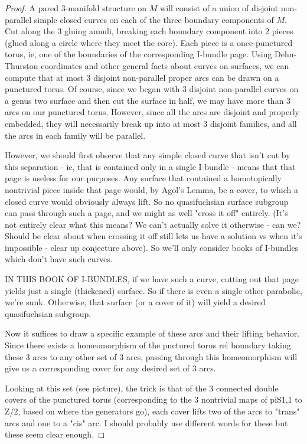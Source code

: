 \documentclass[12pt]{amsart}
\theoremstyle{definition}
\begin{document}
\begin{proof}
A pared 3-manifold structure on $M$ will consist of a union of disjoint
non-parallel simple closed curves on each of the three boundary components of
$M$. Cut along the 3 gluing annuli, breaking each boundary component into
2 pieces (glued along a circle where they meet the core). Each piece is
a once-punctured torus, ie, one of the boundaries of the corresponding
I-bundle page. Using Dehn-Thurston coordinates and other general facts about
curves on surfaces, we can compute that at most 3 disjoint non-parallel
proper arcs can be drawn on a punctured torus. Of course, since we began with
3 disjoint non-parallel curves on a genus two surface and then cut the
surface in half, we may have more than 3 arcs on our punctured torus.
However, since all the arcs are disjoint and properly embedded, they will
necessarily break up into at most
3 disjoint families, and all the arcs in each family will be parallel.

However, we should first observe that any simple closed curve that isn't cut by
this separation - ie, that is contained only in a single I-bundle - means that
that page is useless for our purposes. Any surface that contained
a homotopically nontrivial piece inside that page would, by Agol's Lemma, be
a cover, to which a closed curve would obviously always lift. So no
quasifuchsian surface subgroup can pass through such a page, and we might as
well "cross it off" entirely. (It's not entirely clear what this means? We
can't actually solve it otherwise - can we? Should be clear about when crossing
it off still lets us have a solution vs when it's impossible - clear up
conjecture above). So we'll only consider books of I-bundles which don't have
such curves.

IN THIS BOOK OF I-BUNDLES, if we have such a curve, cutting out that page
yields just a single (thickened) surface. So if there is even a single other
parabolic, we're sunk. Otherwise, that surface (or a cover of it) will yield
a desired quasifuchsian subgroup.

Now it suffices to draw a specific example of these arcs and their lifting
behavior. Since there exists a homeomorphism of the pnctured torus rel boundary
taking these 3 arcs to any other set of 3 arcs, passing through this
homeomorphism will give us a corresponding cover for any desired set of 3 arcs.

Looking at this set (see picture), the trick is that of the 3 connected double
covers of the punctured torus (corresponding to the 3 nontrivial maps of piS1,1
to Z/2, based on where the generators go), each cover lifts two of the arcs to
"trans" arcs and one to a "cis" arc. I should probably use different words for
these but these seem clear enough.


\end{proof}
\end{document}
